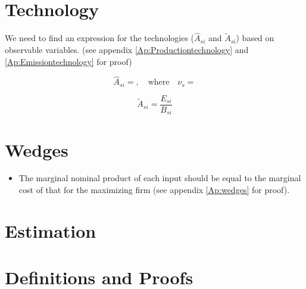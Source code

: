 \documentclass[12pt]{article} %
\begin{document}
\section*{Technology}
We need to find an expression for the technologies ($\hat{A}_{si}$ and $\tilde{A}_{si}$) based on observable variables. (see appendix \ref{Ap:Productiontechnology} and \ref{Ap:Emissiontechnology} for proof)

\begin{equation*}
    \hat{A}_{si} = , \quad \text{where} \quad \nu_s = 
\end{equation*}

\begin{equation*}
    \tilde{A}_{si} = \frac{E_{si}}{B_{si}}
\end{equation*}



\section*{Wedges}
\begin{itemize}
    \item The marginal nominal product of each input should be equal to the marginal cost of that for the maximizing firm (see appendix \ref{Ap:wedges} for proof).
	
\end{itemize}


\section*{Estimation}

\clearpage

\section{Definitions and Proofs} 
\end{document}
